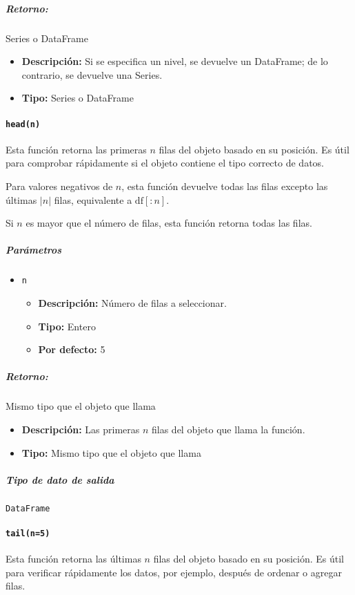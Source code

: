 \subparagraph{Retorno:} Series o DataFrame
\begin{itemize}
    \item \textbf{Descripción:} Si se especifica un nivel, se devuelve un
          DataFrame; de lo contrario, se devuelve una Series.
    \item \textbf{Tipo:} Series o DataFrame
\end{itemize}

\paragraph{\texttt{head(n)}} Esta función retorna las primeras \( n \) filas
del objeto basado en su posición. Es útil para comprobar rápidamente si el
objeto contiene el tipo correcto de datos.

Para valores negativos de \( n \), esta función devuelve todas las filas
excepto las últimas \( |n| \) filas, equivalente a \( \text{df}[:n] \).

Si \( n \) es mayor que el número de filas, esta función retorna todas las
filas.

\subparagraph{\textbf{Parámetros}}
\begin{itemize}
    \item \texttt{n}
          \begin{itemize}
              \item \textbf{Descripción:} Número de filas a seleccionar.
              \item \textbf{Tipo:} Entero
              \item \textbf{Por defecto:} 5
          \end{itemize}
\end{itemize}

\subparagraph{Retorno:} Mismo tipo que el objeto que llama
\begin{itemize}
    \item \textbf{Descripción:} Las primeras \( n \) filas del objeto que llama
          la función.
    \item \textbf{Tipo:} Mismo tipo que el objeto que llama
\end{itemize}

\subparagraph{Tipo de dato de salida} \texttt{DataFrame}

\paragraph{\texttt{tail(n=5)}} Esta función retorna las últimas \( n \) filas
del objeto basado en su posición. Es útil para verificar rápidamente los datos,
por ejemplo, después de ordenar o agregar filas.

